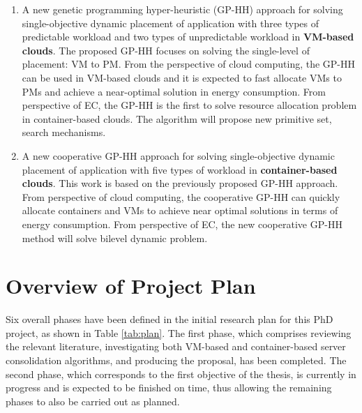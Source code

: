 \begin{enumerate}
	\item A new genetic programming hyper-heuristic (GP-HH) approach for solving single-objective dynamic placement of application with three types of predictable workload and two types of unpredictable workload in \textbf{VM-based clouds}. The proposed GP-HH focuses on solving the single-level of placement: VM to PM. From the perspective of cloud computing,
	the GP-HH can be used in VM-based clouds and it is expected to fast allocate VMs to PMs and achieve a near-optimal solution in energy consumption.
	From perspective of EC,  the GP-HH is the first to solve resource allocation problem in container-based clouds. The algorithm will propose new primitive set, search mechanisms.

	\item A new cooperative GP-HH approach for solving single-objective dynamic placement of application with five types of workload in \textbf{container-based clouds}. This work is based on the previously proposed GP-HH approach.
	From perspective of cloud computing, the cooperative GP-HH can quickly allocate containers and VMs to achieve near optimal solutions in terms of energy consumption.
	From perspective of EC, the new cooperative GP-HH method will solve bilevel dynamic problem.
\end{enumerate}

\section{Overview of Project Plan}
Six overall phases have been defined in the initial research plan for this PhD project, as
shown in Table \ref{tab:plan}. The first phase, which comprises reviewing the relevant literature, investigating both VM-based and container-based server consolidation algorithms, and producing the proposal, has
been completed. The second phase, which corresponds to the first objective of the thesis, is
currently in progress and is expected to be finished on time, thus allowing the remaining
phases to also be carried out as planned.


